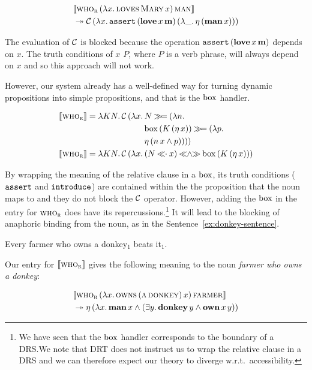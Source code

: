\begin{align*}
& \llbracket \textsc{who}_{\textsc{r}}\,(\lambda x.\, \textsc{loves}\,\textsc{Mary}\,x)\,\textsc{man} \rrbracket \\
& \twoheadrightarrow \mathcal{C}\,(\lambda x.\, \mathtt{assert}\,(\textbf{love}\,x\,\textbf{m})\,(\lambda \_.\, \eta\,(\textbf{man}\,x)))
\end{align*}

The evaluation of $\mathcal{C}$ is blocked because the operation
$\mathtt{assert}\,(\textbf{love}\,x\,\textbf{m})$ depends on $x$. The
truth conditions of \emph{$x$ $P$}, where $P$ is a verb phrase, will always
depend on $x$ and so this approach will not work.

However, our system already has a well-defined way for turning dynamic
propositions into simple propositions, and that is the $\mathrm{box}$ handler.

\begin{align*}
  \sem{\abs{who}_{\abs{r}}} = \lam{K N}{\ap{\CC}{(\lam{x}{
    &N \hsbind (\lam{n}{ \\
    &\ap{\BOX}{(\ap{K}{(\etaE{x})})} \hsbind (\lam{p}{ \\
    &\etaE{(\ap{n}{x} \land p)}})})})}} \\
  \sem{\abs{who}_{\abs{r}}} = \lam{K N}{\ap{\CC}{(\lam{x}{
    &(N \apl x) \andlr \ap{\BOX}{(\ap{K}{(\etaE{x})})}})}}
\end{align*}

By wrapping the meaning of the relative clause in a $\mathrm{box}$, its truth
conditions ($\mathtt{assert}$ and $\mathtt{introduce}$) are contained within the
the proposition that the noun maps to and they do not block the $\mathcal{C}$
operator. However, adding the $\mathrm{box}$ in the entry for $\textsc{who}_{\textsc{r}}$
does have its repercussions.\footnote{We have seen that the $\mathrm{box}$ handler
  corresponds to the boundary of a DRS.\@ We note that DRT does not
  instruct us to wrap the relative clause in a DRS and we can therefore
  expect our theory to diverge w.r.t.\ accessibility.} It will lead to the
blocking of anaphoric binding from the noun, as in the
Sentence~\ref{ex:donkey-sentence}.

\begin{exe}
  \ex Every farmer who owns a donkey$_1$ beats it$_1$. \label{ex:donkey-sentence}
\end{exe}

Our entry for $\llbracket \textsc{who}_{\textsc{r}} \rrbracket$ gives the following meaning to
the noun \emph{farmer who owns a donkey}:

\begin{align*}
& \llbracket \textsc{who}_{\textsc{r}}\,(\lambda x.\, \textsc{owns}\,(\textsc{a}\,\textsc{donkey})\,x)\,\textsc{farmer} \rrbracket \\
& \twoheadrightarrow \eta\,(\lambda x.\, \textbf{man}\,x \land (\exists y.\, \textbf{donkey}\,y \land \textbf{own}\,x\,y))
\end{align*}

